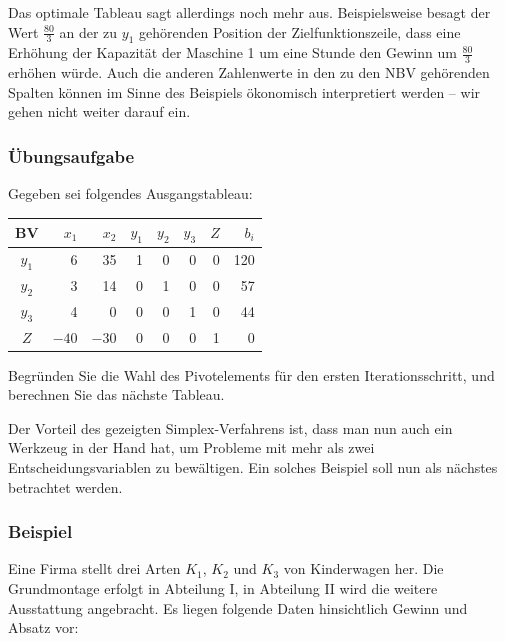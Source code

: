 Das optimale Tableau sagt allerdings noch mehr aus. Beispielsweise besagt der Wert $\tfrac{80}{3}$ an der zu $y_1$ gehörenden Position der Zielfunktionszeile, dass eine Erhöhung der Kapazität der Maschine 1 um eine Stunde den Gewinn um $\tfrac{80}{3}$ erhöhen würde. Auch die anderen Zahlenwerte in den zu den NBV gehörenden Spalten können im Sinne des Beispiels ökonomisch interpretiert werden -- wir gehen nicht weiter darauf ein.

\subsubsection{Übungsaufgabe}

\begin{graukasten}
  Gegeben sei folgendes Ausgangstableau:
  \begin{center}
    \begin{tabular}{|c|r|r|r|r|r|r|r|}
      \hline
      BV & $x_1$ & $x_2$ & $y_1$ & $y_2$ & $y_3$ & $Z$ & $b_i$\\
      \hline
      $y_1$ & 6 & 35 & 1 & 0 & 0 & 0 & 120\\
      $y_2$ & 3 & 14 & 0 & 1 & 0 & 0 & 57\\
      $y_3$ & 4 & 0 & 0 & 0 & 1 & 0 & 44\\
      $Z$ & $-40$ & $-30$ & 0 & 0 & 0 & 1 & 0\\
      \hline
    \end{tabular}
  \end{center}
  Begründen Sie die Wahl des Pivotelements für den ersten Iterationsschritt, und berechnen Sie das nächste Tableau.
\end{graukasten}

Der Vorteil des gezeigten Simplex-Verfahrens ist, dass man nun auch ein Werkzeug in der Hand hat, um Probleme mit mehr als zwei Entscheidungsvariablen zu bewältigen. Ein solches Beispiel soll nun als nächstes betrachtet werden.

\subsubsection{Beispiel}

Eine Firma stellt drei Arten $K_1$, $K_2$ und $K_3$ von Kinderwagen her. Die Grundmontage erfolgt in Abteilung I, in Abteilung II wird die weitere Ausstattung angebracht. Es liegen folgende Daten hinsichtlich Gewinn und Absatz vor:


